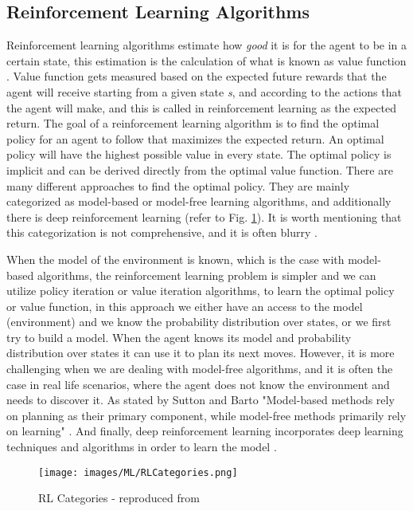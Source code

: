 \documentclass[11pt,letterpaper]{ryersonSGSThesis}
\begin{document}
\begin{ryersonSGSThesis}
        \subsection{Reinforcement Learning Algorithms}
        \label{subsection:Reinforcement Learning Algorithms}
            Reinforcement learning algorithms estimate how \emph{good} it is for the agent to be in a certain state, this estimation is the calculation of what is known as value function \cite{Montague1999}. Value function gets measured based on the expected future rewards that the agent will receive starting from a given state \emph{s}, and according to the actions that the agent will make, and this is called in reinforcement learning as the expected return.
            The goal of a reinforcement learning algorithm is to find the optimal policy for an agent to follow that maximizes the expected return. An optimal policy will have the highest possible value in every state. The optimal policy is implicit and can be derived directly from the optimal value function. There are many different approaches to find the optimal policy. They are mainly categorized as model-based or model-free learning algorithms, and additionally there is deep reinforcement learning (refer to Fig. \ref{fig:RLCats}). It is worth mentioning that this categorization is not comprehensive, and it is often blurry \cite{Brunton2019}.
            
            When the model of the environment is known, which is the case with model-based algorithms, the reinforcement learning problem is simpler and we can utilize policy iteration or value iteration algorithms, to learn the optimal policy or value function, in this approach we either have an access to the model (environment) and we know the probability distribution over states, or we first try to build a model. When the agent knows its model and probability distribution over states it can use it to plan its next moves. However, it is more challenging when we are dealing with model-free algorithms, and it is often the case in real life scenarios, where the agent does not know the environment and needs to discover it.
            As stated by Sutton and Barto "Model-based methods rely on planning as their primary component, while model-free methods primarily rely on learning" \cite{Montague1999}. And finally, deep reinforcement learning incorporates deep learning techniques and algorithms in order to learn the model \cite{silver2015}.  
            
            \begin{figure}[!tbh]
                \centering
                \texttt{[image: images/ML/RLCategories.png]}
                \caption{RL Categories - reproduced from \cite{Brunton2019}}
                \label{fig:RLCats}
            \end{figure}
           

\end{ryersonSGSThesis}
\end{document}
